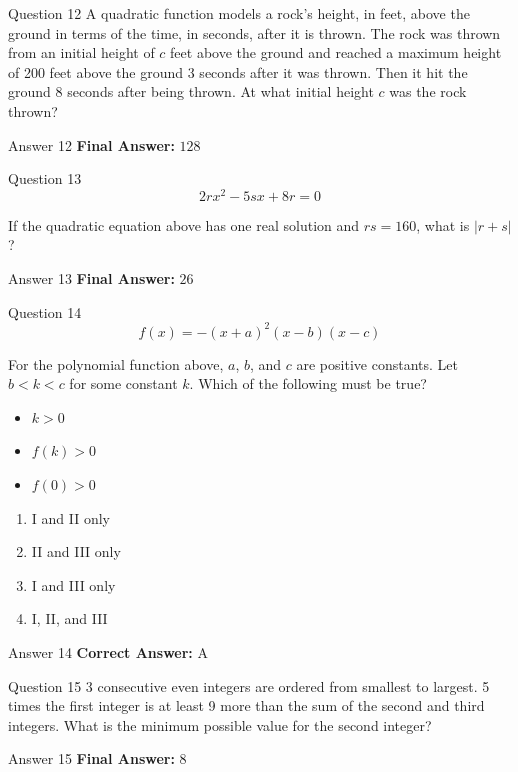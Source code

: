 \documentclass{beamer}
\begin{document}
\begin{frame}{Question 12}
\small
A quadratic function models a rock's height, in feet, above the ground in terms of the time, in seconds, after it is thrown. 
The rock was thrown from an initial height of $c$ feet above the ground and reached a maximum height of 200 feet above the ground 3 seconds after it was thrown. 
Then it hit the ground 8 seconds after being thrown. 
At what initial height $c$ was the rock thrown?
\end{frame}
\begin{frame}{Answer 12}
\small
\textbf{Final Answer:} $\boxed{128}$
\end{frame}

\begin{frame}{Question 13}
\small
\[
2rx^{2}-5sx+8r=0
\]

If the quadratic equation above has one real solution and $rs=160$, what is $\lvert r+s\rvert$?
\end{frame}
\begin{frame}{Answer 13}
\small
\textbf{Final Answer:} $\boxed{26}$
\end{frame}

\begin{frame}{Question 14}
\small
\[
f(x)=-(x+a)^{2}(x-b)(x-c)
\]

For the polynomial function above, $a$, $b$, and $c$ are positive constants.  
Let $b<k<c$ for some constant $k$. Which of the following must be true?

\begin{itemize}
\item[I.] $k>0$
\item[II.] $f(k)>0$
\item[III.] $f(0)>0$
\end{itemize}
\vspace{0.35cm}
\begin{enumerate}
    \item[A.] I and II only
    \item[B.] II and III only
    \item[C.] I and III only
    \item[D.] I, II, and III
\end{enumerate}
\end{frame}
\begin{frame}{Answer 14}
\small
\textbf{Correct Answer:} A
\end{frame}

\begin{frame}{Question 15}
\small
3 consecutive even integers are ordered from smallest to largest. 
5 times the first integer is at least 9 more than the sum of the second and third integers. 
What is the minimum possible value for the second integer?
\end{frame}
\begin{frame}{Answer 15}
\small
\textbf{Final Answer:} $\boxed{8}$
\end{frame}
\end{document}
